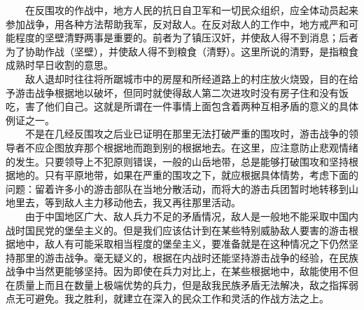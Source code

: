 \documentclass[cn,11pt,chinese]{elegantbook}
\begin{document}
　　在反围攻的作战中，地方人民的抗日自卫军和一切民众组织，应全体动员起来参加战争，用各种方法帮助我军，反对敌人。在反对敌人的工作中，地方戒严和可能程度的坚壁清野两事是重要的。前者为了镇压汉奸，并使敌人得不到消息；后者为了协助作战（坚壁），并使敌人得不到粮食（清野）。这里所说的清野，是指粮食成熟时早日收割的意思。\\
　　敌人退却时往往将所踞城市中的房屋和所经道路上的村庄放火烧毁，目的在给予游击战争根据地以破坏，但同时就使得敌人第二次进攻时没有房子住和没有饭吃，害了他们自己。这就是所谓在一件事情上面包含着两种互相矛盾的意义的具体例证之一。\\
　　不是在几经反围攻之后业已证明在那里无法打破严重的围攻时，游击战争的领导者不应企图放弃那个根据地而跑到别的根据地去。在这里，应注意防止悲观情绪的发生。只要领导上不犯原则错误，一般的山岳地带，总是能够打破围攻和坚持根据地的。只有平原地带，如果在严重的围攻之下，就应根据具体情势，考虑下面的问题：留着许多小的游击部队在当地分散活动，而将大的游击兵团暂时地转移到山地里去，等到敌人主力移动他去，我又再往那里活动。\\
　　由于中国地区广大、敌人兵力不足的矛盾情况，敌人是一般地不能采取中国内战时国民党的堡垒主义的。但是我们应该估计到在某些特别威胁敌人要害的游击根据地中，敌人有可能采取相当程度的堡垒主义，要准备就是在这种情况之下仍然坚持那里的游击战争。毫无疑义的，根据在内战时还能坚持游击战争的经验，在民族战争中当然更能够坚持。因为即使在兵力对比上，在某些根据地中，敌能使用不但在质量上而且在数量上极端优势的兵力，但是敌我民族矛盾无法解决，敌之指挥弱点无可避免。我之胜利，就建立在深入的民众工作和灵活的作战方法之上。\\
\end{document}
